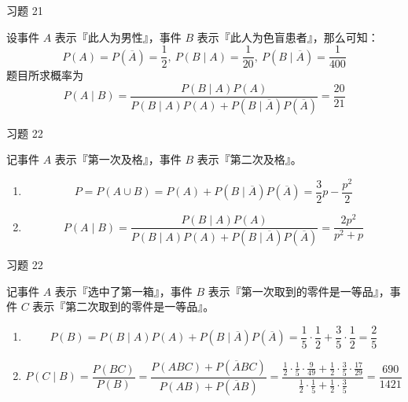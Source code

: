 \begin{problem}
    习题 21
    \begin{solution}
        设事件 $A$ 表示『此人为男性』，事件 $B$ 表示『此人为色盲患者』，那么可知：
        $$
        P(A) = P(\overline{A}) = \frac{1}{2},\ P(B \mid A) = \frac{1}{20},\ P(B \mid \overline{A}) = \frac{1}{400}
        $$
        题目所求概率为
        $$
        P(A \mid B) = \frac{P(B \mid A) P(A)}{P(B \mid A) P(A) + P(B \mid \overline{A}) P(\overline{A})} = \frac{20}{21}
        $$
    \end{solution}
\end{problem}

\begin{problem}
    习题 22
    \begin{solution}
        记事件 $A$ 表示『第一次及格』，事件 $B$ 表示『第二次及格』。

        \begin{enumerate}
            \item[\textbf{1)}]
            $$
            P = P(A \cup B) = P(A) + P(B \mid \overline{A}) P(\overline{A}) = \frac{3}{2} p - \frac{p^2}{2}
            $$
            \item[\textbf{2)}]
            $$
            P(A \mid B) = \frac{P(B \mid A) P(A)}{P(B \mid A) P(A) + P(B \mid \overline{A}) P(\overline{A})} = \frac{2 p^2}{p^2 + p}
            $$
        \end{enumerate}
    \end{solution}
\end{problem}

\begin{problem}
    习题 22
    \begin{solution}
        记事件 $A$ 表示『选中了第一箱』，事件 $B$ 表示『第一次取到的零件是一等品』，事件 $C$ 表示『第二次取到的零件是一等品』。
        \begin{enumerate}
            \item[\textbf{1)}]
            $$
            P(B) = P(B \mid A) P(A) + P(B \mid \overline{A}) P(\overline{A}) = \frac{1}{5} \cdot \frac{1}{2} + \frac{3}{5} \cdot \frac{1}{2} = \frac{2}{5}
            $$
            \item[\textbf{2)}]
            $$
            P(C \mid B) = \frac{P(B C)}{P(B)} = \frac{P(A B C) + P(\overline{A} B C)}{P(A B) + P(\overline{A} B)} = \frac{\frac{1}{2} \cdot \frac{1}{5} \cdot \frac{9}{49} + \frac{1}{2} \cdot \frac{3}{5} \cdot \frac{17}{29}}{\frac{1}{2} \cdot \frac{1}{5} + \frac{1}{2} \cdot \frac{3}{5}} = \frac{690}{1421}
            $$
        \end{enumerate}
    \end{solution}
\end{problem}

